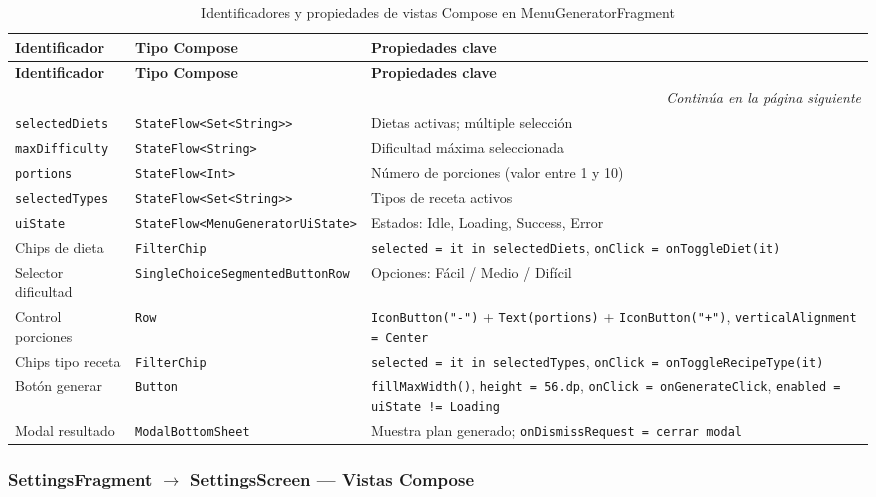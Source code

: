 \documentclass[stu, 12pt, letterpaper, donotrepeattitle, floatsintext, natbib]{apa7}
\begin{document}
\begin{longtable}{@{}p{2.5cm}p{5cm}p{8cm}@{}}
\caption{Identificadores y propiedades de vistas Compose en MenuGeneratorFragment}
\label{tab:idgenerator}\\
\toprule
\textbf{Identificador} & \textbf{Tipo Compose} & \textbf{Propiedades clave} \\
\midrule
\endfirsthead
\toprule
\textbf{Identificador} & \textbf{Tipo Compose} & \textbf{Propiedades clave} \\
\midrule
\endhead
\midrule
\multicolumn{3}{r}{\small\textit{Continúa en la página siguiente}}\\
\endfoot
\bottomrule
\endlastfoot
\texttt{selectedDiets} & \texttt{StateFlow<Set<String>{}>} & Dietas activas; múltiple selección \\[3pt]
\texttt{maxDifficulty} & \texttt{StateFlow<String>} & Dificultad máxima seleccionada \\[3pt]
\texttt{portions} & \texttt{StateFlow<Int>} & Número de porciones (valor entre 1 y 10) \\[3pt]
\texttt{selectedTypes} & \texttt{StateFlow<Set<String>{}>} & Tipos de receta activos \\[3pt]
\texttt{uiState} & \texttt{StateFlow<MenuGeneratorUiState>} & Estados: Idle, Loading, Success, Error \\[3pt]
Chips de dieta & \texttt{FilterChip} & \texttt{selected = it in selectedDiets}, \texttt{onClick = onToggleDiet(it)} \\[3pt]
Selector dificultad & \texttt{SingleChoiceSegmentedButtonRow} & Opciones: Fácil / Medio / Difícil \\[3pt]
Control porciones & \texttt{Row} & \texttt{IconButton("-")} + \texttt{Text(portions)} + \texttt{IconButton("+")}, \texttt{verticalAlignment = Center} \\[3pt]
Chips tipo receta & \texttt{FilterChip} & \texttt{selected = it in selectedTypes}, \texttt{onClick = onToggleRecipeType(it)} \\[3pt]
Botón generar & \texttt{Button} & \texttt{fillMaxWidth()}, \texttt{height = 56.dp}, \texttt{onClick = onGenerateClick}, \texttt{enabled = uiState != Loading} \\[3pt]
Modal resultado & \texttt{ModalBottomSheet} & Muestra plan generado; \texttt{onDismissRequest = cerrar modal} \\
\end{longtable}

\subsubsection{SettingsFragment $\rightarrow$ SettingsScreen --- Vistas Compose}
\end{document}
